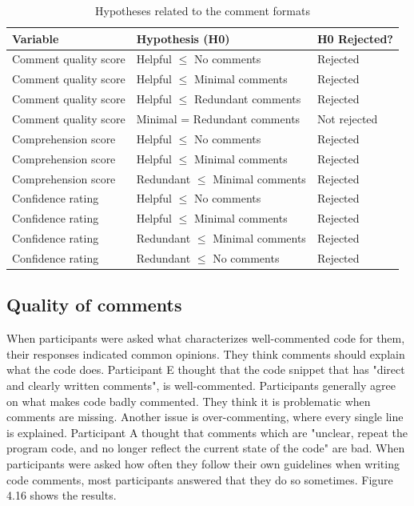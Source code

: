 \begin{table}[ht]
\centering
\small
\begin{tabular}{|p{4cm}|p{6cm}|p{2.5cm}|}
\hline
\rule{0pt}{1.2em}\textbf{Variable} & \textbf{Hypothesis (H0)} & \textbf{H0 Rejected?} \\[0.5em]
\hline
\rule{0pt}{1.2em}Comment quality score & Helpful $\leq$ No comments & Rejected \\[0.5em]
\hline
\rule{0pt}{1.2em}Comment quality score & Helpful $\leq$ Minimal comments & Rejected \\[0.5em]
\hline
\rule{0pt}{1.2em}Comment quality score & Helpful $\leq$ Redundant comments & Rejected \\[0.5em]
\hline
\rule{0pt}{1.2em}Comment quality score & Minimal = Redundant comments & Not rejected \\[0.5em]
\hline
\rule{0pt}{1.2em}Comprehension score & Helpful $\leq$ No comments & Rejected \\[0.5em]
\hline
\rule{0pt}{1.2em}Comprehension score & Helpful $\leq$ Minimal comments & Rejected \\[0.5em]
\hline
\rule{0pt}{1.2em}Comprehension score & Redundant $\leq$ Minimal comments & Rejected \\[0.5em]
\hline
\rule{0pt}{1.2em}Confidence rating & Helpful $\leq$ No comments & Rejected \\[0.5em]
\hline
\rule{0pt}{1.2em}Confidence rating & Helpful $\leq$ Minimal comments & Rejected \\[0.5em]
\hline
\rule{0pt}{1.2em}Confidence rating & Redundant $\leq$ Minimal comments & Rejected \\[0.5em]
\hline
\rule{0pt}{1.2em}Confidence rating & Redundant $\leq$ No comments & Rejected \\[0.5em]
\hline
\end{tabular}
\caption{Hypotheses related to the comment formats}
\end{table}



\subsection{Quality of comments}


When participants were asked what characterizes well-commented code for them, their responses indicated common opinions. They think comments should explain what the code does. Participant E thought that the code snippet that has "direct and clearly written comments", is well-commented. Participants generally agree on what makes code badly commented. They think it is problematic when comments are missing. Another issue is over-commenting, where every single line is explained. Participant A thought that comments which are "unclear, repeat the program code, and no longer reflect the current state of the code" are bad. When participants were asked how often they follow their own guidelines when writing code comments, most participants answered that they do so sometimes. Figure 4.16 shows the results.

